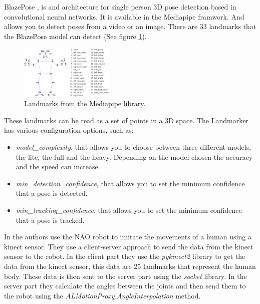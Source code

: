 \documentclass[conference]{IEEEtran}
\begin{document}
BlazePose \cite{b7}, is and architecture for single person 3D pose detection based in convolutional neural networks. It is available in the Mediapipe framwork. And allows you to detect poses from a video or an image.
There are 33 landmarks that the BlazePose model can detect (See figure \ref{fig:landmarksMP}). 
\begin{figure}[htbp]
    \centerline{\includegraphics[width=0.4\textwidth]{images/landmarksMP.jpeg}}
    \caption{Landmarks from the Mediapipe library.}
    \label{fig:landmarksMP}
\end{figure}
These landmarks can be read as a set of points in a 3D space.
The Landmarker has various configuration options, such as:
\begin{itemize}
\item \textit{model\_complexity},  that allows you to choose between three different models, the lite, the full and the heavy. Depending on the model chosen the accuracy and the speed can increase.
\item \textit{min\_detection\_confidence}, that allows you to set the minimum confidence that a pose is detected.
\item \textit{min\_tracking\_confidence}, that allows you to set the minimum confidence that a pose is tracked.
\end{itemize}



In \cite{b7} the authors use the NAO robot to imitate the movements of a human using a kinect sensor. 
They use a client-server approach to send the data from the kinect sensor to the robot.
In the client part they use the \textit{pykinect2} library to get the data from the kinect sensor, this data are 25 landmarks that represent the human body. These data is then sent to the server part using the \textit{socket} library.
In the server part they calculate the angles between the joints and then send them to the robot using the \textit{ALMotionProxy.AngleInterpolation} method.

\end{document}

